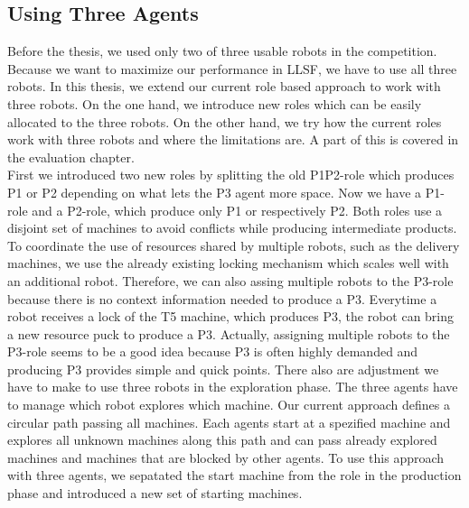 \subsection{Using Three Agents}
Before the thesis, we used only two of three usable robots in the competition. Because we want to maximize our performance in LLSF, we have to use all three robots. In this thesis, we extend our current role based approach to work with three robots. On the one hand, we introduce new roles which can be easily allocated to the three robots. On the other hand, we try how the current roles work with three robots and where the limitations are. A part of this is covered in the evaluation chapter.\\
First we introduced two new roles by splitting the old P1P2-role which produces P1 or P2 depending on what lets the P3 agent more space. Now we have a P1-role and a P2-role, which produce only P1 or respectively P2. Both roles use a disjoint set of machines to avoid conflicts while producing intermediate products. To coordinate the use of resources shared by multiple robots, such as the delivery machines, we use the already existing locking mechanism which scales well with an additional robot. Therefore, we can also assing multiple robots to the P3-role because there is no context information needed to produce a P3. Everytime a robot receives a lock of the T5 machine, which produces P3, the robot can bring a new resource puck to produce a P3. Actually, assigning multiple robots to the P3-role seems to be a good idea because P3 is often highly demanded and producing P3 provides simple and quick points. There also are adjustment we have to make to use three robots in the exploration phase. The three agents have to manage which robot explores which machine. Our current approach defines a circular path passing all machines. Each agents start at a spezified machine and explores all unknown machines along this path and can pass already explored machines and machines that are blocked by other agents. To use this approach with three agents, we sepatated the start machine from the role in the production phase and introduced a new set of starting machines.

